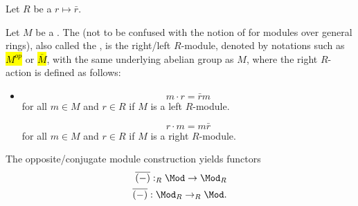 \begin{definition} \label{definition:opposite_module_of_a_module_over_a_ring_with_involution}
Let $R$ be a  $r \mapsto \bar{r}$.
    
    Let $M$ be a . The  (not to be confused with the notion of  for modules over general rings), also called the , is the right/left $R$-module, denoted by notations such as \hl{$M^{op}$} or \hl{$\overline{M}$}, with the same underlying abelian group as $M$, where the right $R$-action is defined as follows:
    \begin{itemize}
        \item $$m \cdot r = \bar{r} m$$ for all $m \in M$ and $r \in R$ if $M$ is a left $R$-module.

        $$r \cdot m = m \bar{r}$$
        for all $m \in M$ and $r \in R$ if $M$ is a right $R$-module.
    \end{itemize}

The opposite/conjugate module construction yields functors
\begin{align*}
\overline{(-)}: _{R} \Mod \to \Mod_R \\
\overline{(-)}: \Mod_{R}  \to _{R} \Mod.
\end{align*}
\end{definition}